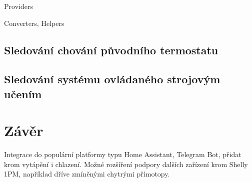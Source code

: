 Providers

Converters, Helpers


\section{Sledování chování původního termostatu}

\section{Sledování systému ovládaného strojovým učením}


\chapter{Závěr}
\label{zaver}

Integrace do populární platformy typu Home Assistant, Telegram Bot, přidat krom vytápění i chlazení. Možné rozšíření podpory dalších zařízení krom Shelly 1PM, například dříve zmíněnými chytrými přímotopy.

